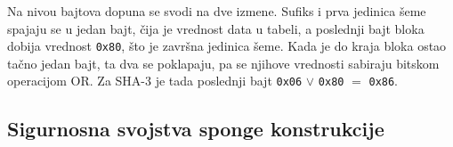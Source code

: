 \begin{table}[H]
\caption[Sufiksi za razdvajanje domena u SHA-3 familiji]{Sufiksi za razdvajanje domena u SHA-3 familiji \cite{fips202, sp800185}}
\centering
\setlength{\tabcolsep}{5pt}
\renewcommand{\arraystretch}{1.4}
\label{tab:sha3_domeni}
\end{table}

Na nivou bajtova dopuna se svodi na dve izmene. Sufiks i prva jedinica šeme spajaju se u jedan bajt, čija je vrednost data u tabeli, a poslednji bajt bloka dobija vrednost \texttt{0x80}, što je završna jedinica šeme. Kada je do kraja bloka ostao tačno jedan bajt, ta dva se poklapaju, pa se njihove vrednosti sabiraju bitskom operacijom OR. Za SHA-3 je tada poslednji bajt \texttt{0x06} $\lor$ \texttt{0x80} $=$ \texttt{0x86}.

\subsection{Sigurnosna svojstva sponge konstrukcije}
\label{subsec:sponge_sigurnost}

